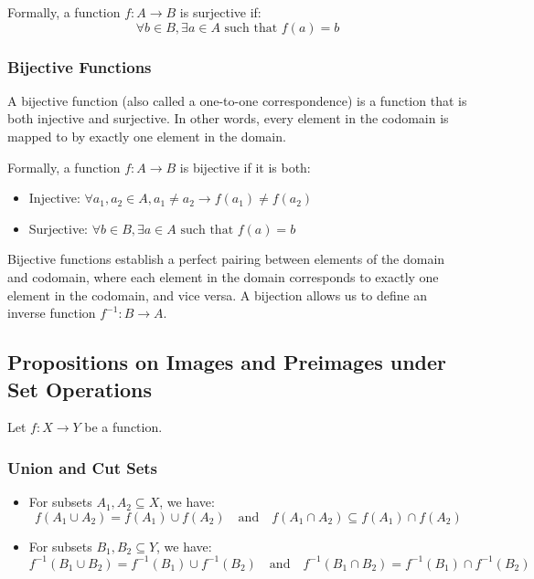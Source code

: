 Formally, a function \(f: A \to B\) is surjective if:
\[
	\forall b \in B, \exists a \in A \text{ such that } f(a) = b
\]

\subsubsection{Bijective Functions}
A bijective function (also called a one-to-one correspondence) is a function that is both injective and surjective. In other words, every element in the codomain is mapped to by exactly one element in the domain.

Formally, a function \(f: A \to B\) is bijective if it is both:
\begin{itemize}[label=\(-\)]
	\item Injective: \(\forall a_1, a_2 \in A, a_1 \neq a_2 \to f(a_1) \neq f(a_2)\)
	\item Surjective: \(\forall b \in B, \exists a \in A \text{ such that } f(a) = b\)
\end{itemize}
 Bijective functions establish a perfect pairing between elements of the domain and codomain, where each element in the domain corresponds to exactly one element in the codomain, and vice versa. A bijection allows us to define an inverse function \(f^{-1}: B \to A\).

\subsection{Propositions on Images and Preimages under Set Operations}

Let \( f : X \to Y \) be a function.

\subsubsection{Union and Cut Sets}

\begin{itemize}[label=\(-\)]
	\item For subsets \( A_1, A_2 \subseteq X \), we have:
	      \[
		      f(A_1 \cup A_2) = f(A_1) \cup f(A_2)
		      \quad \text{and} \quad
		      f(A_1 \cap A_2) \subseteq f(A_1) \cap f(A_2)
	      \]

	\item For subsets \( B_1, B_2 \subseteq Y \), we have:
	      \[
		      f^{-1}(B_1 \cup B_2) = f^{-1}(B_1) \cup f^{-1}(B_2)
		      \quad \text{and} \quad
		      f^{-1}(B_1 \cap B_2) = f^{-1}(B_1) \cap f^{-1}(B_2)
	      \]
\end{itemize}

